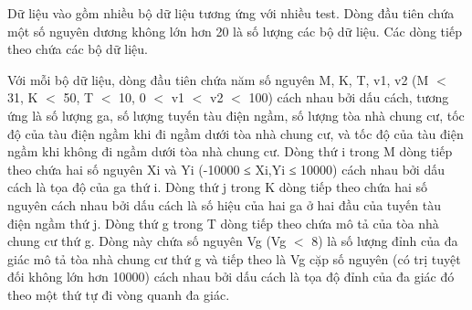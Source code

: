 Dữ liệu vào gồm nhiều bộ dữ liệu tương ứng với nhiều test. Dòng đầu tiên chứa một số nguyên dương không lớn hơn 20 là số lượng các bộ dữ liệu. Các dòng tiếp theo chứa các bộ dữ liệu.  

   Với mỗi bộ dữ liệu, dòng đầu tiên chứa năm số nguyên M, K, T, v1, v2 (M $<$ 31, K $<$ 50, T $<$ 10, 0 $<$ v1 $<$ v2 $<$ 100) cách nhau bởi dấu cách, tương ứng là số lượng ga, số lượng tuyến tàu điện ngầm, số lượng tòa nhà chung cư, tốc độ của tàu điện ngầm khi đi ngầm dưới tòa nhà chung cư, và tốc độ của tàu điện ngầm khi không đi ngầm dưới tòa nhà chung cư. Dòng thứ i trong M dòng tiếp theo chứa hai số nguyên Xi và Yi (-10000 ≤ Xi,Yi ≤ 10000) cách nhau bởi dấu cách là tọa độ của ga thứ i. Dòng thứ j trong K dòng tiếp theo chứa hai số nguyên cách nhau bởi dấu cách là số hiệu của hai ga ở hai đầu của tuyến tàu điện ngầm thứ j. Dòng thứ g trong T dòng tiếp theo chứa mô tả của tòa nhà chung cư thứ g. Dòng này chứa số nguyên Vg (Vg $<$ 8) là số lượng đỉnh của đa giác mô tả tòa nhà chung cư thứ g và tiếp theo là Vg cặp số nguyên (có trị tuyệt đối không lớn hơn 10000) cách nhau bởi dấu cách là tọa độ đỉnh của đa giác đó theo một thứ tự đi vòng quanh đa giác.